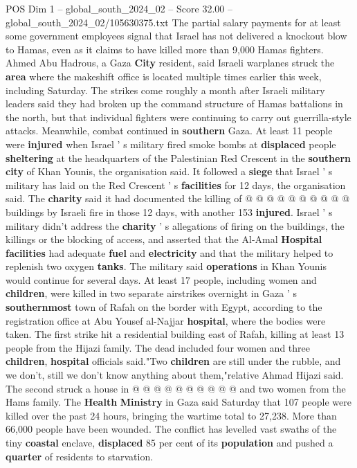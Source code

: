 \begin{textsample}{POS Dim 1 – global\_south\_2024\_02 – Score 32.00 – global\_south\_2024\_02/105630375.txt}
The partial salary payments for at least some government employees signal that Israel has not delivered a knockout blow to Hamas, even as it claims to have killed more than 9,000 Hamas fighters.
Ahmed Abu Hadrous, a Gaza \textbf{City} resident, said Israeli warplanes struck the \textbf{area} where the makeshift office is located multiple times earlier this week, including Saturday.
The strikes come roughly a month after Israeli military leaders said they had broken up the command structure of Hamas battalions in the north, but that individual fighters were continuing to carry out guerrilla-style attacks.
Meanwhile, combat continued in \textbf{southern} Gaza.
At least 11 people were \textbf{injured} when Israel ' s military fired smoke bombs at \textbf{displaced} people \textbf{sheltering} at the headquarters of the Palestinian Red Crescent in the \textbf{southern} \textbf{city} of Khan Younis, the organisation said.
It followed a \textbf{siege} that Israel ' s military has laid on the Red Crescent ' s \textbf{facilities} for 12 days, the organisation said.
The \textbf{charity} said it had documented the killing of @ @ @ @ @ @ @ @ @ @ buildings by Israeli fire in those 12 days, with another 153 \textbf{injured}.
Israel ' s military didn't address the \textbf{charity} ' s allegations of firing on the buildings, the killings or the blocking of access, and asserted that the Al-Amal \textbf{Hospital} \textbf{facilities} had adequate \textbf{fuel} and \textbf{electricity} and that the military helped to replenish two oxygen \textbf{tanks}.
The military said \textbf{operations} in Khan Younis would continue for several days.
At least 17 people, including women and \textbf{children}, were killed in two separate airstrikes overnight in Gaza ' s \textbf{southernmost} town of Rafah on the border with Egypt, according to the registration office at Abu Yousef al-Najjar \textbf{hospital}, where the bodies were taken.
The first strike hit a residential building east of Rafah, killing at least 13 people from the Hijazi family.
The dead included four women and three \textbf{children}, \textbf{hospital} officials said."Two \textbf{children} are still under the rubble, and we don't, still we don't know anything about them,"relative Ahmad Hijazi said.
The second struck a house in @ @ @ @ @ @ @ @ @ @ and two women from the Hams family.
The \textbf{Health} \textbf{Ministry} in Gaza said Saturday that 107 people were killed over the past 24 hours, bringing the wartime total to 27,238.
More than 66,000 people have been wounded.
The conflict has levelled vast swaths of the tiny \textbf{coastal} enclave, \textbf{displaced} 85 per cent of its \textbf{population} and pushed a \textbf{quarter} of residents to starvation.

\end{textsample}
